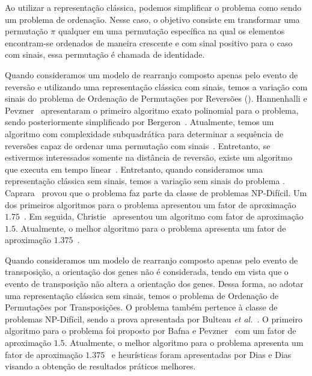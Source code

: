 Ao utilizar a representação clássica, podemos simplificar o problema como sendo um problema de ordenação. Nesse caso, o objetivo consiste em transformar uma permutação $\pi$ qualquer em uma permutação específica na qual os elementos encontram-se ordenados de maneira crescente e com sinal positivo para o caso com sinais, essa permutação é chamada de identidade.

Quando consideramos um modelo de rearranjo composto apenas pelo evento de reversão e utilizando uma representação clássica com sinais, temos a variação com sinais do problema de Ordenação de Permutações por Reversões (\SbR). Hannenhalli e Pevzner~\cite{1999-hannenhalli-pevzner} apresentaram o primeiro algoritmo exato polinomial para o problema, sendo posteriormente simplificado por Bergeron~\cite{2005-bergeron}. Atualmente, temos um algoritmo com complexidade subquadrática para determinar a sequência de reversões capaz de ordenar uma permutação com sinais~\cite{2007-tannier-etal}. Entretanto, se estivermos interessados somente na distância de reversão, existe um algoritmo que executa em tempo linear~\cite{2001-bader-etal}. Entretanto, quando consideramos uma representação clássica sem sinais, temos a variação sem sinais do problema \SbR. Caprara~\cite{1999-caprara} provou que o problema faz parte da classe de problemas NP-Difícil. Um dos primeiros algoritmos para o problema apresentou um fator de aproximação $1.75$~\cite{1996-bafna-pevzner}. Em seguida, Christie~\cite{1998a-christie} apresentou um algoritmo com fator de aproximação $1.5$. Atualmente, o melhor algoritmo para o problema apresenta um fator de aproximação $1.375$~\cite{2002-berman-etal}.

Quando consideramos um modelo de rearranjo composto apenas pelo evento de transposição, a orientação dos genes não é considerada, tendo em vista que o evento de transposição não altera a orientação dos genes. Dessa forma, ao adotar uma representação clássica sem sinais, temos o problema de Ordenação de Permutações por Transposições. O problema também pertence à classe de problemas NP-Difícil, sendo a prova apresentada por Bulteau \textit{et al.}~\cite{2012-bulteau-etal}. O primeiro algoritmo para o problema foi proposto por Bafna e Pevzner~\cite{1998-bafna-pevzner} com um fator de aproximação $1.5$. Atualmente, o melhor algoritmo para o problema apresenta um fator de aproximação $1.375$~\cite{2006-elias-hartman,2022-silva-etal} e heurísticas foram apresentadas por Dias e Dias~\cite{2010c-dias-dias} visando a obtenção de resultados práticos melhores.

